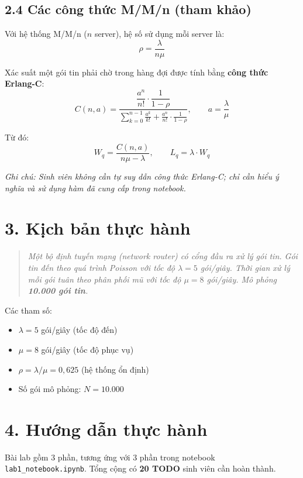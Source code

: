 \documentclass[12pt,a4paper]{article}
\begin{document}
\subsection{2.4 Các công thức M/M/n (tham khảo)}

Với hệ thống M/M/n ($n$ server), hệ số sử dụng mỗi server là:
\[
  \rho = \frac{\lambda}{n\mu}
\]

Xác suất một gói tin phải chờ trong hàng đợi được tính bằng \textbf{công thức Erlang-C}:
\[
  C(n, a) = \frac{\dfrac{a^n}{n!} \cdot \dfrac{1}{1-\rho}}
  {\displaystyle\sum_{k=0}^{n-1} \frac{a^k}{k!} + \frac{a^n}{n!} \cdot \frac{1}{1-\rho}},
  \qquad a = \frac{\lambda}{\mu}
\]

Từ đó:
\[
  W_q = \frac{C(n,a)}{n\mu - \lambda}, \qquad
  L_q = \lambda \cdot W_q
\]

\textit{Ghi chú: Sinh viên không cần tự suy dẫn công thức Erlang-C; chỉ cần hiểu ý nghĩa và sử dụng hàm đã cung cấp trong notebook.}

\section{3. Kịch bản thực hành}

\begin{quote}
\itshape
Một bộ định tuyến mạng (network router) có cổng đầu ra xử lý gói tin.
Gói tin đến theo quá trình Poisson với tốc độ $\lambda = 5$ gói/giây.
Thời gian xử lý mỗi gói tuân theo phân phối mũ với tốc độ $\mu = 8$ gói/giây.
Mô phỏng \textbf{10.000 gói tin}.
\end{quote}

Các tham số:
\begin{itemize}[nosep]
  \item $\lambda = 5$ gói/giây (tốc độ đến)
  \item $\mu = 8$ gói/giây (tốc độ phục vụ)
  \item $\rho = \lambda/\mu = 0{,}625$ (hệ thống ổn định)
  \item Số gói mô phỏng: $N = 10.000$
\end{itemize}

\section{4. Hướng dẫn thực hành}

Bài lab gồm 3 phần, tương ứng với 3 phần trong notebook \texttt{lab1\_notebook.ipynb}. Tổng cộng có \textbf{20 TODO} sinh viên cần hoàn thành.
\end{document}
